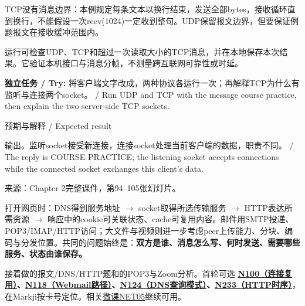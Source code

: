 TCP没有消息边界：本例规定每条文本以换行结束，发送全部bytes，接收循环直到换行，不能假设一次recv(1024)一定收到整句。UDP保留报文边界，但要保证例题报文在接收缓冲范围内。


运行可检查UDP、TCP和超过一次读取大小的TCP消息，并在本地保存本次结果。它验证本机接口与消息分帧，不测量跨互联网可靠性或时延。


\textbf{独立任务 / Try:} 将客户端文字改成，两种协议各运行一次；再解释TCP为什么有监听与连接两个socket。 / Run UDP and TCP with the message course practice, then explain the two server-side TCP sockets.



\begin{StudySolution}{预期与解释 / Expected result}


输出。监听socket接受新连接，连接socket处理当前客户端的数据，职责不同。 / The reply is COURSE PRACTICE; the listening socket accepts connections while the connected socket exchanges this client's data.


\end{StudySolution}


来源：Chapter 2完整课件，第94–105张幻灯片。





打开网页时：DNS得到服务地址 \ensuremath{\to} socket取得所选传输服务 \ensuremath{\to} HTTP表达所需资源 \ensuremath{\to} 响应中的cookie可关联状态、cache可复用内容。邮件用SMTP投递、POP3/IMAP/HTTP访问；大文件与视频则进一步考虑peer上传能力、分块、编码与分发位置。共同的问题始终是：\textbf{双方是谁、消息怎么写、何时发送、需要哪些服务、状态由谁保存。}


接着做的报文/DNS/HTTP题和的POP3与Zoom分析。首轮可选 \textbf{\href{https://crazyshout.github.io/micro-course/cards.html\#CS5222-N100}{N100（连接复用）}、\href{https://crazyshout.github.io/micro-course/cards.html\#CS5222-N118}{N118（Webmail路径）}、\href{https://crazyshout.github.io/micro-course/cards.html\#CS5222-N124}{N124（DNS查询模式）}、\href{https://crazyshout.github.io/micro-course/cards.html\#CS5222-N233}{N233（HTTP时序）}}，在Markji按卡号定位。相关\href{https://crazyshout.github.io/micro-course/?lesson=net05}{微课NET05}继续可用。


